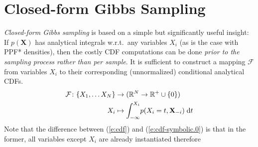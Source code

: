 \documentclass[letterpaper]{article}
\newcommand{\bvec}[1]{\textbf{#1}}
\newcommand{\pr}{p}
\newcommand{\dd}{\;\mathrm{d}} %
\begin{document}
\section{Closed-form Gibbs Sampling}
\label{sect:symbolic.gibbs}

%
\emph{Closed-form Gibbs sampling} is based on a simple but significantly useful insight:
If $\pr(\bvec{X})$
has analytical integrals w.r.t.\ any variables $X_i$ (as is the case with PPF* densities),
then the costly CDF computations can be done \emph{prior to the sampling process rather than per sample}. 
It is sufficient to construct a mapping $\mathcal{F}$ from variables $X_i$ to their corresponding (unnormalized) conditional analytical CDFs. 
{\footnotesize
\begin{align} 
 \mathcal{F}\colon \{X_1, \ldots X_N\} &\to (\mathbb{R}^N \to \mathbb{R}^{+} \cup \{0\}) \notag\\
 X_i &\mapsto \int_{-\infty}^{X_i} \! \pr(X_i = t , \bvec{X}_{-i}) \dd  t 
\label{e:cdf-symbolic.0}	
\end{align}
}
Note that the difference between (\ref{e:cdf}) and (\ref{e:cdf-symbolic.0}) is that in the former, 
all variables except $X_i$ are already instantiated therefore 
\end{document}
